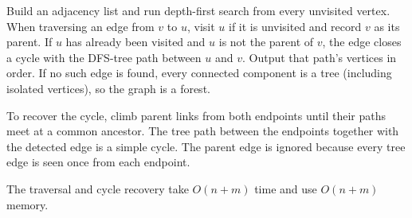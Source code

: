Build an adjacency list and run depth-first search from every unvisited vertex. When traversing an edge from $v$ to $u$, visit $u$ if it is unvisited and record $v$ as its parent. If $u$ has already been visited and $u$ is not the parent of $v$, the edge closes a cycle with the DFS-tree path between $u$ and $v$. Output that path's vertices in order. If no such edge is found, every connected component is a tree (including isolated vertices), so the graph is a forest.

To recover the cycle, climb parent links from both endpoints until their paths meet at a common ancestor. The tree path between the endpoints together with the detected edge is a simple cycle. The parent edge is ignored because every tree edge is seen once from each endpoint.

The traversal and cycle recovery take $O(n+m)$ time and use $O(n+m)$ memory.
